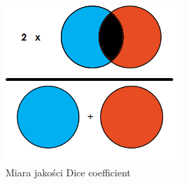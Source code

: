 \documentclass{classrep}
\begin{document}
{        \begin{figure}
            \centering
            \includegraphics[width=0.6\textwidth]{img/dice.png}
            \caption{Miara jakości Dice coefficient \cite{url:dice}}
            \label{fig:dice}
        \end{figure}
        \FloatBarrier
    }
\end{document}
